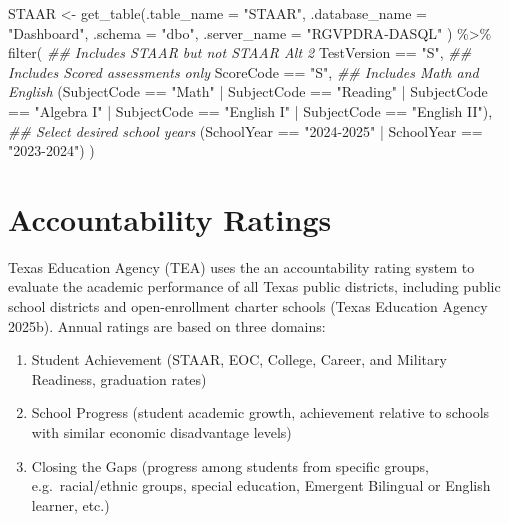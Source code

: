\documentclass[
  letterpaper,
  DIV=11,
  numbers=noendperiod]{scrreprt}
\newenvironment{Shaded}{\begin{snugshade}}{\end{snugshade}}
\newcommand{\AttributeTok}[1]{\textcolor[rgb]{0.40,0.45,0.13}{#1}}
\newcommand{\DocumentationTok}[1]{\textcolor[rgb]{0.37,0.37,0.37}{\textit{#1}}}
\newcommand{\FunctionTok}[1]{\textcolor[rgb]{0.28,0.35,0.67}{#1}}
\newcommand{\NormalTok}[1]{\textcolor[rgb]{0.00,0.23,0.31}{#1}}
\newcommand{\OtherTok}[1]{\textcolor[rgb]{0.00,0.23,0.31}{#1}}
\newcommand{\SpecialCharTok}[1]{\textcolor[rgb]{0.37,0.37,0.37}{#1}}
\newcommand{\StringTok}[1]{\textcolor[rgb]{0.13,0.47,0.30}{#1}}
\providecommand{\tightlist}{%
  \setlength{\itemsep}{0pt}\setlength{\parskip}{0pt}}
\begin{document}
\begin{Shaded}
\begin{Highlighting}[]
\NormalTok{STAAR }\OtherTok{\textless{}{-}} \FunctionTok{get\_table}\NormalTok{(}\AttributeTok{.table\_name =} \StringTok{"STAAR"}\NormalTok{, }
                   \AttributeTok{.database\_name =} \StringTok{"Dashboard"}\NormalTok{,}
                   \AttributeTok{.schema =} \StringTok{"dbo"}\NormalTok{, }
                   \AttributeTok{.server\_name =} \StringTok{"RGVPDRA{-}DASQL"}
\NormalTok{                  ) }\SpecialCharTok{\%\textgreater{}\%}
  \FunctionTok{filter}\NormalTok{(}
    \DocumentationTok{\#\# Includes STAAR but not STAAR Alt 2 }
\NormalTok{      TestVersion }\SpecialCharTok{==} \StringTok{"S"}\NormalTok{, }
    \DocumentationTok{\#\# Includes Scored assessments only}
\NormalTok{      ScoreCode }\SpecialCharTok{==} \StringTok{"S"}\NormalTok{, }
    \DocumentationTok{\#\# Includes Math and English }
\NormalTok{    (SubjectCode }\SpecialCharTok{==} \StringTok{"Math"} \SpecialCharTok{|}
\NormalTok{     SubjectCode }\SpecialCharTok{==} \StringTok{"Reading"} \SpecialCharTok{|}
\NormalTok{     SubjectCode }\SpecialCharTok{==} \StringTok{"Algebra I"} \SpecialCharTok{|}
\NormalTok{     SubjectCode }\SpecialCharTok{==} \StringTok{"English I"} \SpecialCharTok{|}
\NormalTok{     SubjectCode }\SpecialCharTok{==} \StringTok{"English II"}\NormalTok{),}
    \DocumentationTok{\#\# Select desired school years}
\NormalTok{    (SchoolYear }\SpecialCharTok{==} \StringTok{"2024{-}2025"} \SpecialCharTok{|}
\NormalTok{     SchoolYear }\SpecialCharTok{==} \StringTok{"2023{-}2024"}\NormalTok{)}
\NormalTok{  )}
\end{Highlighting}
\end{Shaded}

\section{Accountability Ratings}\label{sec-Account}

Texas Education Agency (TEA) uses the an accountability rating system to
evaluate the academic performance of all Texas public districts,
including public school districts and open-enrollment charter schools
(Texas Education Agency 2025b). Annual ratings are based on three
domains:

\begin{enumerate}
\def\labelenumi{\arabic{enumi}.}
\tightlist
\item
  Student Achievement (STAAR, EOC, College, Career, and Military
  Readiness, graduation rates)
\item
  School Progress (student academic growth, achievement relative to
  schools with similar economic disadvantage levels)
\item
  Closing the Gaps (progress among students from specific groups,
  e.g.~racial/ethnic groups, special education, Emergent Bilingual or
  English learner, etc.)
\end{enumerate}
\end{document}
